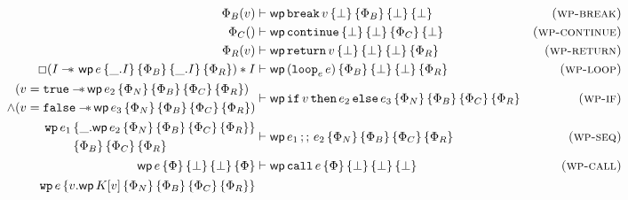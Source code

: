 \documentclass{article}
\numberwithin{algorithm}{section}
\newcommand{\progspec}[1]{\{ #1 \}}
\newcommand{\true}{\texttt{true}}
\newcommand{\false}{\texttt{false}}
\newcommand{\cmdloop}[1]{\texttt{loop}_{#1}\,}
\newcommand{\cmdbreak}{\texttt{break}\,}
\newcommand{\cmdcontinue}{\texttt{continue}}
\newcommand{\cmdreturn}{\texttt{return}\,}
\newcommand{\cmdif}{\texttt{if}\,}
\newcommand{\cmdthen}{\,\texttt{then}\,}
\newcommand{\cmdelse}{\,\texttt{else}\,}
\newcommand{\cmdseq}{\,;;\,}
\newcommand{\cmdcall}{\texttt{call}\,}
\newcommand{\pure}[1]{\text{PenCtx}(#1)}
\newcommand{\cred}{\text{red}}
\newcommand{\wand}{-\mkern-8mu*\,}
\newcommand{\wpre}[5]{\textsf{wp}\, #1\, \progspec{#2}\, \progspec{#3}\, \progspec{#4}\, \progspec{#5}}
\begin{document}

    
\begin{figure}[h]
    $$
    \begin{aligned}
        \Phi_B(v) &\vdash \wpre{\cmdbreak v}{\bot}{\Phi_B}{\bot}{\bot} & \textsc{(wp-break)} \\
        \Phi_C() &\vdash \wpre{\cmdcontinue}{\bot}{\bot}{\Phi_C}{\bot} & \textsc{(wp-continue)} \\
        \Phi_R(v) &\vdash \wpre{\cmdreturn v}{\bot}{\bot}{\bot}{\Phi_R} & \textsc{(wp-return)} \\
        \Box(I \wand{}\, \wpre{e}{\_. I}{\Phi_B}{\_. I}{\Phi_R}) * I &\vdash \wpre{(\cmdloop{e}e)}{\Phi_B}{\bot}{\bot}{\Phi_R} & \textsc{(wp-loop)} \\
        \begin{aligned}
            &(v = \true \wand \wpre{e_2}{\Phi_N}{\Phi_B}{\Phi_C}{\Phi_R}) \\
            \land &(v = \false \wand \wpre{e_3}{\Phi_N}{\Phi_B}{\Phi_C}{\Phi_R})
        \end{aligned} &\vdash \wpre{\cmdif v \cmdthen e_2 \cmdelse e_3}{\Phi_N}{\Phi_B}{\Phi_C}{\Phi_R} & \textsc{(wp-if)} \\
        \begin{aligned}
            \texttt{wp}\,e_1\,& \progspec{\_.\wpre{e_2}{\Phi_N}{\Phi_B}{\Phi_C}{\Phi_R}} \\
                            & \progspec{\Phi_B}\,\progspec{\Phi_C}\,\progspec{\Phi_R}
        \end{aligned} &\vdash \wpre{e_1 \cmdseq e_2}{\Phi_N}{\Phi_B}{\Phi_C}{\Phi_R} & \textsc{(wp-seq)} \\
        \wpre{e}{\Phi}{\bot}{\bot}{\Phi} &\vdash \wpre{\cmdcall e}{\Phi}{\bot}{\bot}{\bot} & \textsc{(wp-call)} \\
        \begin{aligned}
            \texttt{wp}\,e\,& \progspec{v. \wpre{K[v]}{\Phi_N}{\Phi_B}{\Phi_C}{\Phi_R}} \\

\end{aligned}
\end{aligned}$$
\end{figure}
\end{document}
